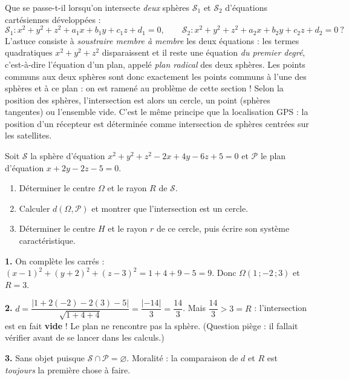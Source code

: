 \documentclass[11pt]{article}
\newcommand{\cle}[1]{{\popxbold\color{popdark}#1}}
\begin{document}
\begin{savaistu}
Que se passe-t-il lorsqu'on intersecte \emph{deux} sphères $\mathcal{S}_{1}$ et $\mathcal{S}_{2}$ d'équations cartésiennes développées :
\[ \mathcal{S}_{1} : x^{2}+y^{2}+z^{2}+a_{1}x+b_{1}y+c_{1}z+d_{1} = 0, \qquad \mathcal{S}_{2} : x^{2}+y^{2}+z^{2}+a_{2}x+b_{2}y+c_{2}z+d_{2} = 0 \ ? \]
L'astuce consiste à \emph{soustraire membre à membre} les deux équations : les termes quadratiques $x^{2}+y^{2}+z^{2}$ disparaissent et il reste une équation \emph{du premier degré}, c'est-à-dire l'équation d'un \cle{plan}, appelé \emph{plan radical} des deux sphères. Les points communs aux deux sphères sont donc exactement les points communs à l'une des sphères et à ce plan : on est ramené au problème de cette section ! Selon la position des sphères, l'intersection est alors un cercle, un point (sphères tangentes) ou l'ensemble vide. C'est le même principe que la localisation GPS : la position d'un récepteur est déterminée comme intersection de sphères centrées sur les satellites.
\end{savaistu}

\begin{exercice}
Soit $\mathcal{S}$ la sphère d'équation $x^{2} + y^{2} + z^{2} - 2x + 4y - 6z + 5 = 0$ et $\mathcal{P}$ le plan d'équation $x + 2y - 2z - 5 = 0$.
\begin{enumerate}
\item Déterminer le centre $\Omega$ et le rayon $R$ de $\mathcal{S}$.
\item Calculer $d(\Omega, \mathcal{P})$ et montrer que l'intersection est un cercle.
\item Déterminer le centre $H$ et le rayon $r$ de ce cercle, puis écrire son système caractéristique.
\end{enumerate}
\end{exercice}

\begin{corrige}
\textbf{1.} On complète les carrés : $(x-1)^{2} + (y+2)^{2} + (z-3)^{2} = 1 + 4 + 9 - 5 = 9$. Donc $\Omega(1\,; -2\,; 3)$ et $R = 3$.

\textbf{2.} $d = \dfrac{|1 + 2(-2) - 2(3) - 5|}{\sqrt{1+4+4}} = \dfrac{|-14|}{3} = \dfrac{14}{3}$. Mais $\dfrac{14}{3} > 3 = R$ : l'intersection est en fait \textbf{vide} ! Le plan ne rencontre pas la sphère. (Question piège : il fallait vérifier avant de se lancer dans les calculs.)

\textbf{3.} Sans objet puisque $\mathcal{S} \cap \mathcal{P} = \varnothing$. Moralité : la comparaison de $d$ et $R$ est \emph{toujours} la première chose à faire.
\end{corrige}
\end{document}
